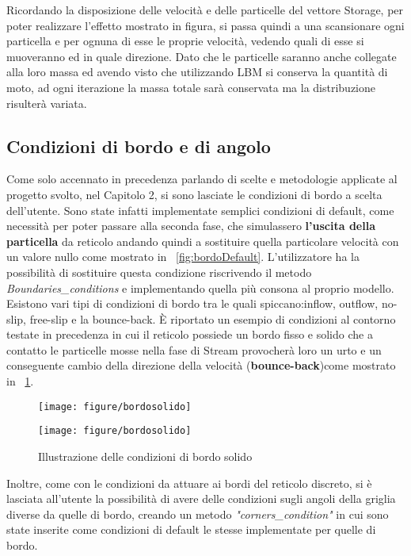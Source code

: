 {Ricordando la disposizione delle velocit\`a e delle particelle del vettore Storage, per poter realizzare l'effetto mostrato in figura, si passa quindi a una scansionare ogni particella e per ognuna di esse le proprie velocit\`a, vedendo quali di esse si muoveranno ed in quale direzione. Dato che le particelle saranno anche collegate alla loro massa ed avendo visto che utilizzando LBM si conserva la quantit\`a di moto, ad ogni iterazione la massa totale sar\`a conservata ma la distribuzione risulter\`a variata.
\subsection{Condizioni di bordo e di angolo}
Come solo accennato in precedenza parlando di scelte e metodologie applicate al progetto svolto, nel Capitolo 2, si sono lasciate le condizioni di bordo a scelta dell'utente. Sono state infatti implementate semplici condizioni di default, come necessit\`a per poter passare alla seconda fase, che simulassero \textbf{l'uscita della particella} da reticolo andando quindi a sostituire quella particolare velocit\`a con un valore nullo come mostrato in \figurename~\ref{fig:bordoDefault}. L'utilizzatore ha la possibilit\`a di sostituire questa condizione riscrivendo il metodo \textit{Boundaries\_conditions} e implementando quella pi\`u consona al proprio modello. Esistono vari tipi di condizioni di bordo tra le quali spiccano:inflow, outflow, no-slip, free-slip e la bounce-back. \`E riportato un esempio di condizioni al contorno testate in precedenza in cui il reticolo possiede un bordo fisso e solido che a contatto le particelle mosse nella fase di Stream provocher\`a loro un urto e un conseguente cambio della direzione della velocit\`a (\textbf{bounce-back})come mostrato in \figurename~\ref{fig:bordosolido}.
\begin{figure}[!htb]
	\begin{minipage}{0.5\textwidth}
		\hspace{-1.5 cm}
				\texttt{[image: figure/bordosolido]}
			\caption{Illustrazione delle condizioni di bordo di default \label{fig:bordoDefault}}
	\end{minipage}\hfill
	\begin{minipage}{0.45\textwidth}
				\centering
				\texttt{[image: figure/bordosolido]}\\
			\caption{Illustrazione delle condizioni di bordo solido \label{fig:bordosolido}}
	\end{minipage}
\end{figure}\hfill
Inoltre, come con le condizioni da attuare ai bordi del reticolo discreto, si \`e lasciata all'utente la possibilit\`a di avere delle condizioni sugli angoli della griglia diverse da quelle di bordo, creando un metodo \textit{"corners\_condition"} in cui sono state inserite come condizioni di default le stesse implementate per quelle di bordo.
}
